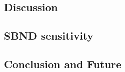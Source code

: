 \subsection{Discussion}
\subsection{SBND sensitivity}
\subsection{Conclusion and Future}

\clearpage
